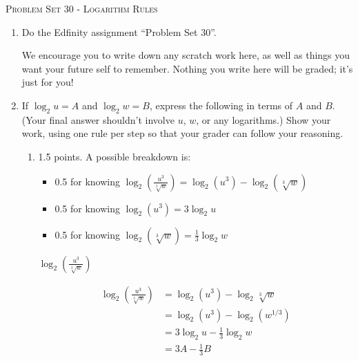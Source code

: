 \documentclass{article}
\newcommand{\doedfinity}[2][\newpage]{
  \begin{problem}[#1]
    Do the Edfinity assignment ``Problem Set #2''.

    We encourage you to write down any scratch work here, as well as
    things you want your future self to remember. Nothing you write
    here will be graded; it's just for you!
  \end{problem}
}
\begin{document}
\begin{center}
  \large\textsc{Problem Set 30 - Logarithm Rules}
\end{center}

\begin{enumerate}
\item  {}

  \doedfinity{30}

\item %

  If $\log_2 u = A$ and $\log_2 w = B$, express the following in terms of $A$ and $B$. (Your final answer shouldn't involve $u$, $w$, or any logarithms.) Show your work, using one rule per step so that your grader can follow your reasoning.

  \begin{enumerate}

  \item

    \begin{grading}
      1.5 points. A possible breakdown is:
      \begin{itemize}[nosep]
      \item 0.5 for knowing $\displaystyle \log_2\left(\frac{u^3}{\sqrt[3]{w}}\right) = \log_2 (u^3) - \log_2(\sqrt[3]{w})$
      \item 0.5 for knowing $\log_2(u^3) = 3 \log_2 u$
      \item 0.5 for knowing $\log_2(\sqrt[3]{w}) = \frac{1}{3} \log_2 w$
      \end{itemize}
    \end{grading}

    \begin{problem}[\vfill]
      $\displaystyle \log_2\left(\frac{u^3}{\sqrt[3]{w}}\right)$
    \end{problem}

    \begin{solution}
      \begin{align*}
        \log_2\left(\frac{u^3}{\sqrt[3]{w}}\right) &= 
        \log_2 (u^3) - \log_2 \sqrt[3]{w} \\
        &= \log_2 (u^3) - \log_2 (w^{1/3}) \\
        &= 3\log_2 u - \tfrac{1}{3} \log_2 w\\
        &= \boxed{3A - \tfrac{1}{3} B}
      \end{align*}
    \end{solution}


\end{enumerate}
\end{enumerate}
\end{document}
